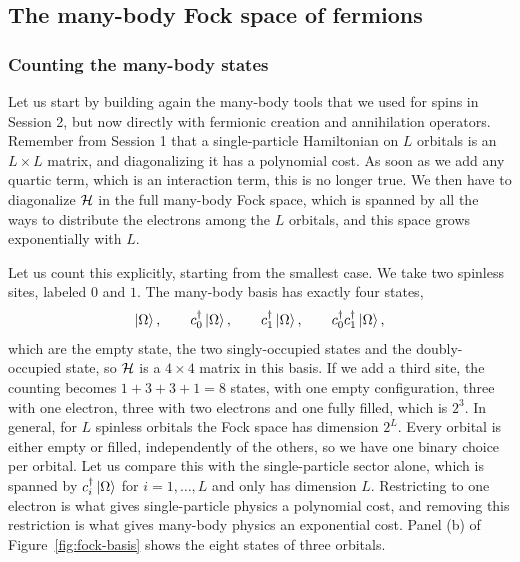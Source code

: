 \documentclass[lecture_notes.tex]{subfiles}
\begin{document}
\subsection{The many-body Fock space of fermions}
\subsubsection{Counting the many-body states}
Let us start by building again the many-body tools that we used for spins in Session 2, but now
directly with fermionic creation and annihilation operators. Remember from Session 1 that a
single-particle Hamiltonian on $L$ orbitals is an $L\times L$ matrix, and diagonalizing it has a
polynomial cost. As soon as we add any quartic term, which is an interaction term, this is no
longer true. We then have to diagonalize $\mathcal{H}$ in the full many-body Fock space, which is spanned
by all the ways to distribute the electrons among the $L$ orbitals, and this space grows
exponentially with $L$.

Let us count this explicitly, starting from the smallest case. We take two spinless sites, labeled
$0$ and $1$. The many-body basis has exactly four states,
\begin{equation}
  \ket{\Omega}, \qquad c^{\dagger}_{0}\ket{\Omega}, \qquad c^{\dagger}_{1}\ket{\Omega}, \qquad c^{\dagger}_{0}c^{\dagger}_{1}\ket{\Omega},
\end{equation}
which are the empty state, the two singly-occupied states and the doubly-occupied state, so $\mathcal{H}$
is a $4\times4$ matrix in this basis. If we add a third site, the counting becomes
$1 + 3 + 3 + 1 = 8$ states, with one empty configuration, three with one electron, three with two electrons and one
fully filled, which is $2^3$. In general, for $L$ spinless orbitals the Fock space has dimension
$2^L$. Every orbital is either empty or filled, independently of the others, so we have one binary
choice per orbital. Let us compare this with the single-particle sector alone, which is spanned by
$c^{\dagger}_{i}\ket{\Omega}$ for $i=1,\dots,L$ and only has dimension $L$. Restricting to one electron is what
gives single-particle physics a polynomial cost, and removing this restriction is what gives
many-body physics an exponential cost. Panel (b) of Figure~\ref{fig:fock-basis} shows the eight
states of three orbitals.
\end{document}
